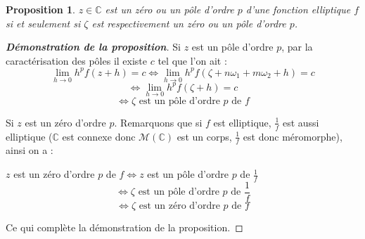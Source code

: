 \documentclass[12pt]{article}
\newtheorem{proposition}{Proposition}
\begin{document}
\begin{proposition}
    $z \in \mathbb{C}$ est un zéro ou un pôle d’ordre $p$ d’une fonction elliptique $f$ si et seulement si $\zeta$ est respectivement un zéro ou un pôle d’ordre $p$.

\end{proposition}

\begin{proof}[\textbf{Démonstration de la proposition}]

Si $z$ est un pôle d'ordre $p$, par la caractérisation des pôles il existe $c$ tel que l'on ait :
\[
\lim_{h \to 0} h^p f(z + h) = c \iff \lim_{h \to 0} h^p f(\zeta + n\omega_1 + m\omega_2 + h) = c
\]
\[
\iff \lim_{h \to 0} h^p f(\zeta + h) = c
\]
\[
\iff \zeta \text{ est un pôle d'ordre } p \text{ de } f
\]

Si $z$ est un zéro d'ordre $p$. Remarquons que si $f$ est elliptique, $\frac{1}{f}$ est aussi elliptique ($\mathbb{C}$ est connexe donc $\mathcal{M}(\mathbb{C})$ est un corps, $\frac{1}{f}$ est donc méromorphe), ainsi on a :

$z$ est un zéro d'ordre $p$ de $f \iff z $ est un pôle d'ordre $p$ de $\frac{1}{f}$
\[
\iff \zeta \text{ est un pôle d'ordre } p \text{ de } \frac{1}{f}
\]
\[
\iff \zeta \text{ est un zéro d'ordre } p \text{ de } f
\]

Ce qui complète la démonstration de la proposition.
\end{proof}
\end{document}
